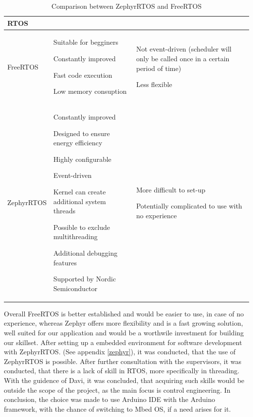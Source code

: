 \begin{table}[H]
      \makegapedcells
      \setlength{\tabcolsep}{3pt}
  \begin{tabularx}{\linewidth}{|>{\RaggedRight}p{25mm}|*{2}{I |}}
      \hline
  RTOS
      &       &           \\
      \hline
  FreeRTOS 
      &   \item Suitable for begginers
          \item Constantly improved
          \item Fast code execution
          \item Low memory consuption
          &   \item Not event-driven (scheduler will only be called once in a certain period of time)
              \item Less flexible
              \\
      \hline
  ZephyrRTOS
      &   \item Constantly improved
          \item Designed to ensure energy efficiency
          \item Highly configurable
          \item Event-driven
          \item Kernel can create additional system threads
          \item Possible to exclude multithreading
          \item Additional debugging features
          \item Supported by Nordic Semiconductor
          &   \item More difficult to set-up
              \item Potentially complicated to use with no experience
              \\
      \hline

\end{tabularx}
\caption{Comparison between ZephyrRTOS and FreeRTOS}
\label{table.rtos}
\end{table}

Overall FreeRTOS is better established and would be easier to use, in case of no experience, whereas Zephyr offers more flexibility and is a fast growing solution, well suited for our application and would be a worthwile investment for building our skillset. \cite{Industry}
After setting up a embedded environment for software development with ZephyrRTOS. (See appendix \ref{zephyr}), it was conducted, that the use of ZephyrRTOS is possible.
After further consultation with the supervisors, it was conducted, that there is a lack of skill in RTOS, more specifically in threading. With the guidence of Davi, it was concluded, that acquiring such skills would be outside the scope of the project, as the main focus is control engineering.
In conclusion, the choice was made to use Arduino IDE with the Arduino framework, with the chance of switching to Mbed OS, if a need arises for it.
